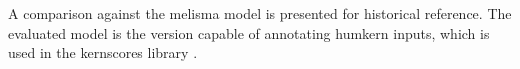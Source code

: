 
A comparison against the \gls{melisma} model is presented
for historical reference. The evaluated model is the version
capable of annotating \gls{humkern} inputs, which is used in
the \gls{kernscores} library \parencite{sapp2005online}.
